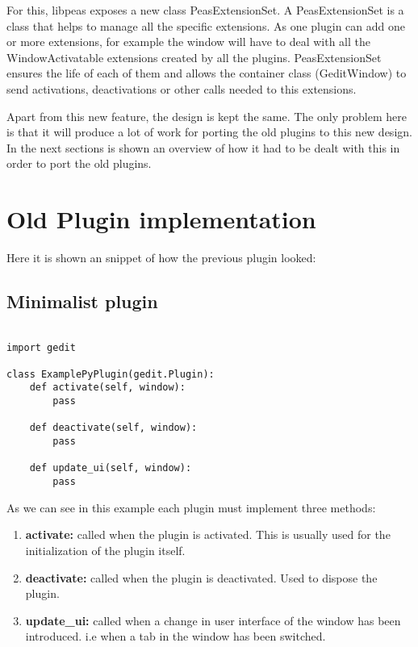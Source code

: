 For this, libpeas exposes a new class PeasExtensionSet. A PeasExtensionSet is a class that helps to manage all the specific extensions. As one plugin can add one or more extensions, for example the window will have to deal with all the WindowActivatable extensions created by all the plugins. PeasExtensionSet ensures the life of each of them and allows the container class (GeditWindow) to send activations, deactivations or other calls needed to this extensions.

Apart from this new feature, the design is kept the same. The only problem here is that it will produce a lot of work for porting the old plugins to this new design. In the next sections is shown an overview of how it had to be dealt with this in order to port the old plugins.

\newpage
\section{Old Plugin implementation}

Here it is shown an snippet of how the previous plugin looked:

\subsection{Minimalist plugin}

\begin{lstlisting}[style=python]

import gedit

class ExamplePyPlugin(gedit.Plugin):
    def activate(self, window):
        pass

    def deactivate(self, window):
        pass

    def update_ui(self, window):
        pass

\end{lstlisting}

As we can see in this example each plugin must implement three methods:
\begin{enumerate}
  \item \textbf{activate:} called when the plugin is activated. This is usually used for the initialization of the plugin itself.
  \item \textbf{deactivate:} called when the plugin is deactivated. Used to dispose the plugin.
  \item \textbf{update\_ui:} called when a change in user interface of the window has been introduced. i.e when a tab in the window has been switched.
\end{enumerate}

